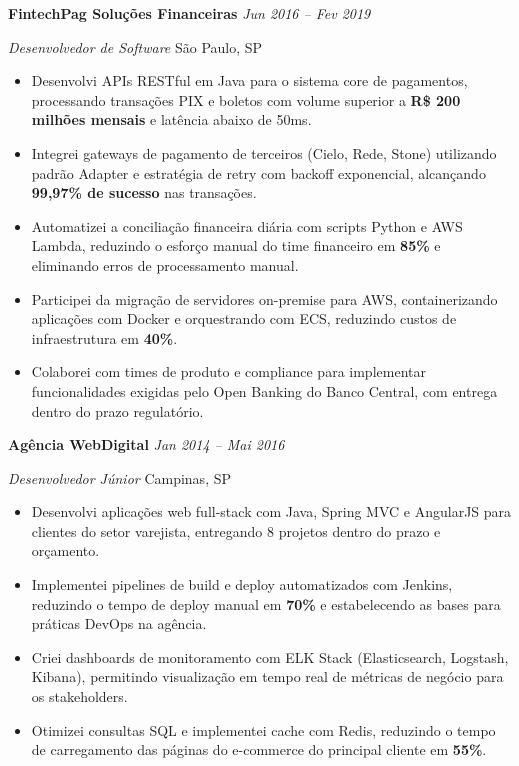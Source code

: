 \documentclass[11pt,a4paper]{article}
\newcommand{\roleheader}[4]{%
  \noindent\textbf{\large #1} \hfill \textcolor{brblue}{\small\textit{#2}}\par
  \noindent\textit{#3} \hfill \textcolor{brdark}{\small #4}\par
  \vspace{0.25cm}%
}
\begin{document}
\vspace{0.6cm}

\roleheader{FintechPag Soluções Financeiras}{Jun 2016 -- Fev 2019}{Desenvolvedor de Software}{São Paulo, SP}

\begin{itemize}
  \item Desenvolvi APIs RESTful em Java para o sistema core de pagamentos, processando transações PIX e boletos com volume superior a \textbf{R\$ 200 milhões mensais} e latência abaixo de 50ms.
  \item Integrei gateways de pagamento de terceiros (Cielo, Rede, Stone) utilizando padrão Adapter e estratégia de retry com backoff exponencial, alcançando \textbf{99,97\% de sucesso} nas transações.
  \item Automatizei a conciliação financeira diária com scripts Python e AWS Lambda, reduzindo o esforço manual do time financeiro em \textbf{85\%} e eliminando erros de processamento manual.
  \item Participei da migração de servidores on-premise para AWS, containerizando aplicações com Docker e orquestrando com ECS, reduzindo custos de infraestrutura em \textbf{40\%}.
  \item Colaborei com times de produto e compliance para implementar funcionalidades exigidas pelo Open Banking do Banco Central, com entrega dentro do prazo regulatório.
\end{itemize}

\vspace{0.6cm}

\roleheader{Agência WebDigital}{Jan 2014 -- Mai 2016}{Desenvolvedor Júnior}{Campinas, SP}

\begin{itemize}
  \item Desenvolvi aplicações web full-stack com Java, Spring MVC e AngularJS para clientes do setor varejista, entregando 8 projetos dentro do prazo e orçamento.
  \item Implementei pipelines de build e deploy automatizados com Jenkins, reduzindo o tempo de deploy manual em \textbf{70\%} e estabelecendo as bases para práticas DevOps na agência.
  \item Criei dashboards de monitoramento com ELK Stack (Elasticsearch, Logstash, Kibana), permitindo visualização em tempo real de métricas de negócio para os stakeholders.
  \item Otimizei consultas SQL e implementei cache com Redis, reduzindo o tempo de carregamento das páginas do e-commerce do principal cliente em \textbf{55\%}.
\end{itemize}
\end{document}
